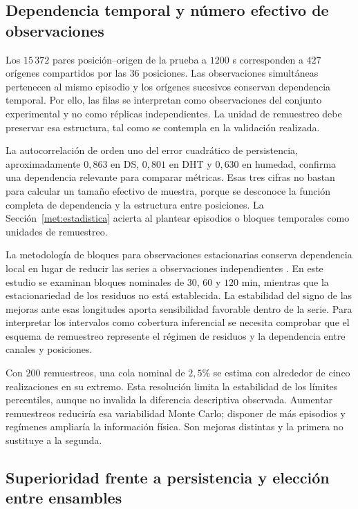\subsection{Dependencia temporal y número efectivo de observaciones}

Los $15\,372$ pares posición--origen de la prueba a $1200$ s corresponden a $427$ orígenes compartidos por las $36$ posiciones. Las observaciones simultáneas pertenecen al mismo episodio y los orígenes sucesivos conservan dependencia temporal. Por ello, las filas se interpretan como observaciones del conjunto experimental y no como réplicas independientes. La unidad de remuestreo debe preservar esa estructura, tal como se contempla en la validación realizada.

La autocorrelación de orden uno del error cuadrático de persistencia, aproximadamente $0{,}863$ en DS, $0{,}801$ en DHT y $0{,}630$ en humedad, confirma una dependencia relevante para comparar métricas. Esas tres cifras no bastan para calcular un tamaño efectivo de muestra, porque se desconoce la función completa de dependencia y la estructura entre posiciones. La Sección~\ref{met:estadistica} acierta al plantear episodios o bloques temporales como unidades de remuestreo.

La metodología de bloques para observaciones estacionarias conserva dependencia local en lugar de reducir las series a observaciones independientes \cite{kunsch1989}. En este estudio se examinan bloques nominales de $30$, $60$ y $120$ min, mientras que la estacionariedad de los residuos no está establecida. La estabilidad del signo de las mejoras ante esas longitudes aporta sensibilidad favorable dentro de la serie. Para interpretar los intervalos como cobertura inferencial se necesita comprobar que el esquema de remuestreo represente el régimen de residuos y la dependencia entre canales y posiciones.

Con $200$ remuestreos, una cola nominal de $2{,}5\%$ se estima con alrededor de cinco realizaciones en su extremo. Esta resolución limita la estabilidad de los límites percentiles, aunque no invalida la diferencia descriptiva observada. Aumentar remuestreos reduciría esa variabilidad Monte Carlo; disponer de más episodios y regímenes ampliaría la información física. Son mejoras distintas y la primera no sustituye a la segunda.

\subsection{Superioridad frente a persistencia y elección entre ensambles}

